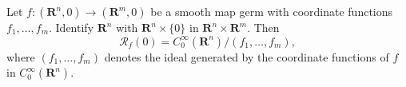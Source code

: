 Let $f: (\mathbf{R}^n, 0) \to (\mathbf{R}^m, 0)$ be a smooth map germ with coordinate functions $f_1, \ldots, f_m$. Identify $\mathbf{R}^n$ with $\mathbf{R}^n \times \{0\}$ in $\mathbf{R}^n \times \mathbf{R}^m$. Then
$$
\mathcal{R}_f(0) = C_0^\infty(\mathbf{R}^n) / (f_1, \ldots, f_m),
$$
where $(f_1, \ldots, f_m)$ denotes the ideal generated by the coordinate functions of $f$ in $C_0^\infty(\mathbf{R}^n)$.

